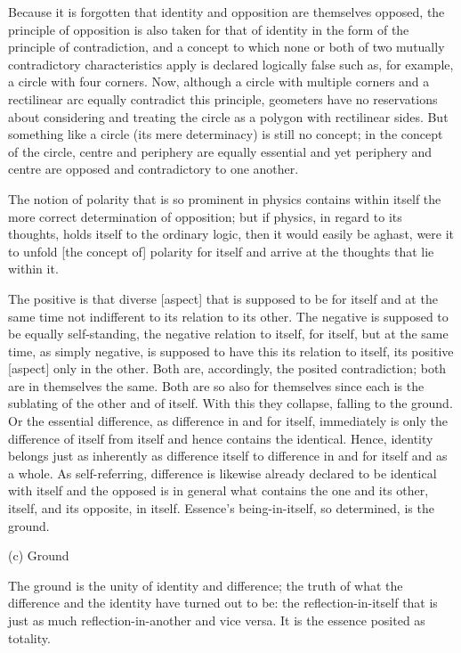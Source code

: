 Because it is forgotten that identity and opposition are themselves opposed,
the principle of opposition is also taken for that of identity
in the form of the principle of contradiction,
and a concept to which none or both of
two mutually contradictory characteristics apply
is declared logically false such as,
for example, a circle with four corners.
Now, although a circle with multiple corners
and a rectilinear arc equally contradict this principle,
geometers have no reservations about considering
and treating the circle as a polygon with rectilinear sides.
But something like a circle (its mere determinacy) is still no concept;
in the concept of the circle, centre and periphery are equally essential
and yet periphery and centre are opposed and contradictory to one another.

The notion of polarity that is so prominent in physics contains
within itself the more correct determination of opposition;
but if physics, in regard to its thoughts, holds itself to the ordinary logic,
then it would easily be aghast, were it to unfold [the concept of]
polarity for itself and arrive at the thoughts that lie within it.

The positive is that diverse [aspect]
that is supposed to be for itself and at the same time
not indifferent to its relation to its other.
The negative is supposed to be equally self-standing,
the negative relation to itself, for itself,
but at the same time, as simply negative,
is supposed to have this its relation to itself,
its positive [aspect] only in the other.
Both are, accordingly, the posited contradiction;
both are in themselves the same.
Both are so also for themselves since each is
the sublating of the other and of itself.
With this they collapse, falling to the ground.
Or the essential difference, as difference in and for itself,
immediately is only the difference of itself from itself
and hence contains the identical.
Hence, identity belongs just as inherently as difference itself
to difference in and for itself and as a whole.
As self-referring, difference is likewise already
declared to be identical with itself and
the opposed is in general what contains the one and its other,
itself, and its opposite, in itself.
Essence's being-in-itself, so determined, is the ground.

(c) Ground

The ground is the unity of identity and difference;
the truth of what the difference and the identity have turned out to be:
the reflection-in-itself that is just as much
reflection-in-another and vice versa.
It is the essence posited as totality.

